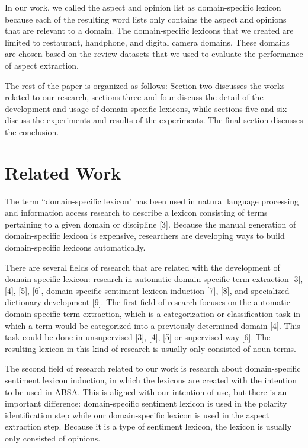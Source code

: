 \documentclass[a4paper,conference]{IEEEtran}
\begin{document}
In our work, we called the aspect and opinion list as domain-specific lexicon because each of the resulting word lists only contains the aspect and opinions that are relevant to a domain. The domain-specific lexicons that we created are limited to restaurant, handphone, and digital camera domains. These domains are chosen based on the review datasets that we used to evaluate the performance of aspect extraction.

The rest of the paper is organized as follows: Section two discusses the works related to our research, sections three and four discuss the detail of the development and usage of domain-specific lexicons, while sections five and six discuss the experiments and results of the experiments. The final section discusses the conclusion. 

\section{Related Work}
The term ``domain-specific lexicon" has been used in natural language processing and information access research to describe a lexicon consisting of terms pertaining to a given domain or discipline [3]. Because the manual generation of domain-specific lexicon is expensive, researchers are developing ways to build domain-specific lexicons automatically. 

There are several fields of research that are related with the development of domain-specific lexicon: research in automatic domain-specific term extraction [3], [4], [5], [6], domain-specific sentiment lexicon induction [7], [8], and specialized dictionary development [9]. The first field of research focuses on the automatic domain-specific term extraction, which is a categorization or classification task in which a term would be categorized into a previously determined domain [4]. This task could be done in unsupervised [3], [4], [5] or supervised way [6]. The resulting lexicon in this kind of research is usually only consisted of noun terms.

The second field of research related to our work is research about domain-specific sentiment lexicon induction, in which the lexicons are created with the intention to be used in ABSA. This is aligned with our intention of use, but there is an important difference: domain-specific sentiment lexicon is used in the polarity identification step while our domain-specific lexicon is used in the aspect extraction step. Because it is a type of sentiment lexicon, the lexicon is usually only consisted of opinions.
\end{document}
